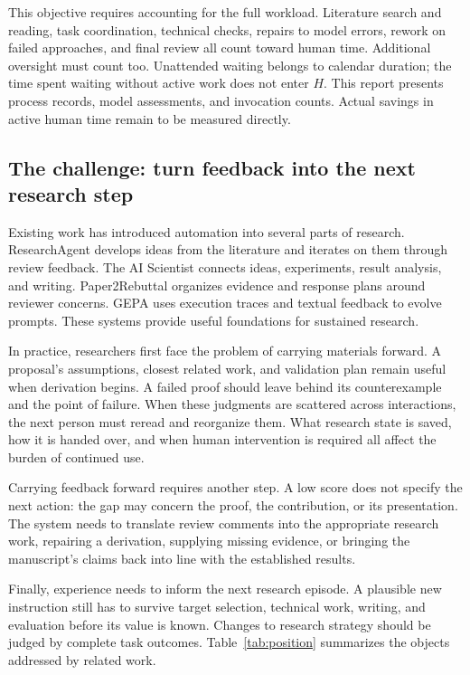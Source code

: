 This objective requires accounting for the full workload. Literature search and reading, task coordination, technical checks, repairs to model errors, rework on failed approaches, and final review all count toward human time. Additional oversight must count too. Unattended waiting belongs to calendar duration; the time spent waiting without active work does not enter $H$. This report presents process records, model assessments, and invocation counts. Actual savings in active human time remain to be measured directly.

\subsection{The challenge: turn feedback into the next research step}
\label{sec:related}
Existing work has introduced automation into several parts of research. ResearchAgent develops ideas from the literature and iterates on them through review feedback. The AI Scientist connects ideas, experiments, result analysis, and writing. Paper2Rebuttal organizes evidence and response plans around reviewer concerns. GEPA uses execution traces and textual feedback to evolve prompts. These systems provide useful foundations for sustained research.

In practice, researchers first face the problem of carrying materials forward. A proposal's assumptions, closest related work, and validation plan remain useful when derivation begins. A failed proof should leave behind its counterexample and the point of failure. When these judgments are scattered across interactions, the next person must reread and reorganize them. What research state is saved, how it is handed over, and when human intervention is required all affect the burden of continued use.

Carrying feedback forward requires another step. A low score does not specify the next action: the gap may concern the proof, the contribution, or its presentation. The system needs to translate review comments into the appropriate research work, repairing a derivation, supplying missing evidence, or bringing the manuscript's claims back into line with the established results.

Finally, experience needs to inform the next research episode. A plausible new instruction still has to survive target selection, technical work, writing, and evaluation before its value is known. Changes to research strategy should be judged by complete task outcomes. Table~\ref{tab:position} summarizes the objects addressed by related work.


